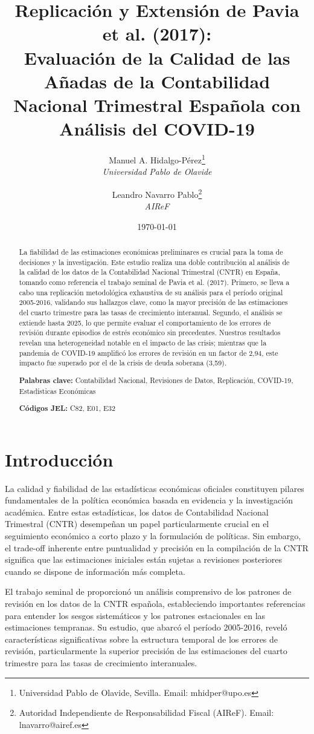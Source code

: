 \documentclass{article}
\title{\textbf{Replicación y Extensión de Pavia et al. (2017): \\Evaluación de la Calidad de las Añadas de la Contabilidad Nacional Trimestral Española con Análisis del COVID-19}}
\author{
    Manuel A. Hidalgo-Pérez\thanks{Universidad Pablo de Olavide, Sevilla. Email: mhidper@upo.es} \\ 
    \textit{Universidad Pablo de Olavide} \\[0.5em]
    \and
    Leandro Navarro Pablo\thanks{Autoridad Independiente de Responsabilidad Fiscal (AIReF). Email: lnavarro@airef.es} \\
    \textit{AIReF}
}
\date{\today}
\begin{document}
\maketitle

\begin{abstract}
\noindent La fiabilidad de las estimaciones económicas preliminares es crucial para la toma de decisiones y la investigación. Este estudio realiza una doble contribución al análisis de la calidad de los datos de la Contabilidad Nacional Trimestral (CNTR) en España, tomando como referencia el trabajo seminal de Pavia et al. (2017). Primero, se lleva a cabo una replicación metodológica exhaustiva de su análisis para el período original 2005-2016, validando sus hallazgos clave, como la mayor precisión de las estimaciones del cuarto trimestre para las tasas de crecimiento interanual. Segundo, el análisis se extiende hasta 2025, lo que permite evaluar el comportamiento de los errores de revisión durante episodios de estrés económico sin precedentes. Nuestros resultados revelan una heterogeneidad notable en el impacto de las crisis; mientras que la pandemia de COVID-19 amplificó los errores de revisión en un factor de 2,94, este impacto fue superado por el de la crisis de deuda soberana (3,59). 

\noindent \textbf{Palabras clave:} Contabilidad Nacional, Revisiones de Datos, Replicación, COVID-19, Estadísticas Económicas

\noindent \textbf{Códigos JEL:} C82, E01, E32
\end{abstract}

\newpage

\section{Introducción}

La calidad y fiabilidad de las estadísticas económicas oficiales constituyen pilares fundamentales de la política económica basada en evidencia y la investigación académica. Entre estas estadísticas, los datos de Contabilidad Nacional Trimestral (CNTR) desempeñan un papel particularmente crucial en el seguimiento económico a corto plazo y la formulación de políticas. Sin embargo, el trade-off inherente entre puntualidad y precisión en la compilación de la CNTR significa que las estimaciones iniciales están sujetas a revisiones posteriores cuando se dispone de información más completa.

El trabajo seminal de \citet{pavia2017} proporcionó un análisis comprensivo de los patrones de revisión en los datos de la CNTR española, estableciendo importantes referencias para entender los sesgos sistemáticos y los patrones estacionales en las estimaciones tempranas. Su estudio, que abarcó el período 2005-2016, reveló características significativas sobre la estructura temporal de los errores de revisión, particularmente la superior precisión de las estimaciones del cuarto trimestre para las tasas de crecimiento interanuales.
\end{document}
